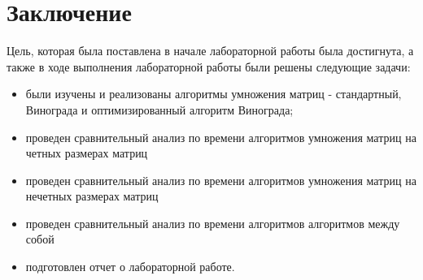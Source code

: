 \chapter*{Заключение}

Цель, которая была поставлена в начале лабораторной работы была достигнута, а также в ходе выполнения лабораторной работы были решены следующие задачи:

\begin{itemize}
	\item были изучены и реализованы алгоритмы умножения матриц - стандартный, Винограда и оптимизированный алгоритм Винограда;
    \item проведен сравнительный анализ по времени алгоритмов умножения матриц на четных размерах матриц
	\item проведен сравнительный анализ по времени алгоритмов умножения матриц на нечетных размерах матриц
	\item проведен сравнительный анализ по времени алгоритмов алгоритмов между собой
	\item подготовлен отчет о лабораторной работе.
\end{itemize}